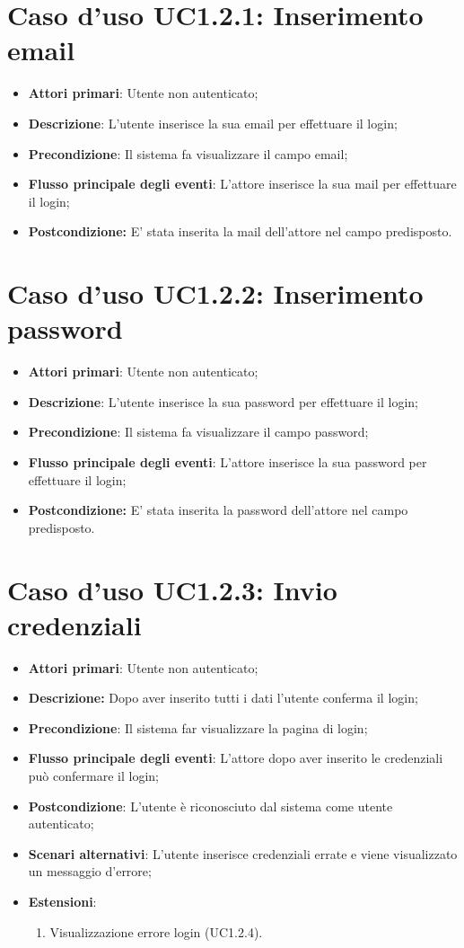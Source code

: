 \section{Caso d'uso UC1.2.1: Inserimento email}
\begin{itemize}
	\item \textbf{Attori primari}: Utente non autenticato;
	\item \textbf{Descrizione}: L'utente inserisce la sua email per effettuare il login;
	\item \textbf{Precondizione}: Il sistema fa visualizzare il campo email;
	\item \textbf{Flusso principale degli eventi}: L'attore inserisce la sua mail per effettuare il login;
	\item \textbf{Postcondizione:} E' stata inserita la mail dell'attore nel campo predisposto. 
\end{itemize}

\section{Caso d'uso UC1.2.2: Inserimento password}
\begin{itemize}
	\item \textbf{Attori primari}: Utente non autenticato;
	\item \textbf{Descrizione}: L'utente inserisce la sua password per effettuare il login;
	\item \textbf{Precondizione}: Il sistema fa visualizzare il campo password;
	\item \textbf{Flusso principale degli eventi}: L'attore inserisce la sua password per effettuare il login;
	\item \textbf{Postcondizione:} E' stata inserita la password dell'attore nel campo predisposto. 
\end{itemize}
\section{Caso d'uso UC1.2.3: Invio credenziali}
\begin{itemize}
	\item \textbf{Attori primari}: Utente non autenticato;
	\item \textbf{Descrizione:} Dopo aver inserito tutti i dati l'utente conferma il login;
	\item \textbf{Precondizione}: Il sistema far visualizzare la pagina di login;
	\item \textbf{Flusso principale degli eventi}: L'attore dopo aver inserito le credenziali può confermare il login;
	\item \textbf{Postcondizione}: L'utente è riconosciuto dal sistema come utente autenticato;
	\item \textbf{Scenari alternativi}: L'utente inserisce credenziali errate e viene visualizzato un messaggio d'errore;
	\item \textbf{Estensioni}:
	\begin{enumerate}
		\item Visualizzazione errore login (UC1.2.4).
	\end{enumerate} 
\end{itemize}
